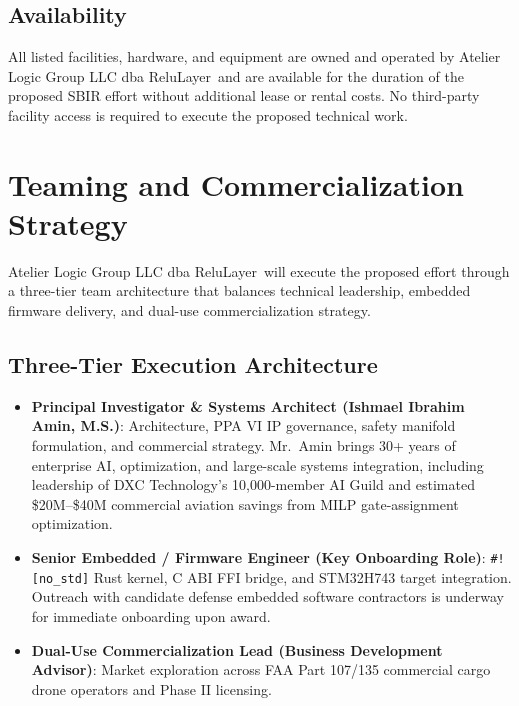 \documentclass[11pt]{article}
\begin{document}
\subsection{Availability}

All listed facilities, hardware, and equipment are owned and operated by Atelier Logic Group LLC dba ReluLayer\texttrademark\ and are available for the duration of the proposed SBIR effort without additional lease or rental costs. No third-party facility access is required to execute the proposed technical work.

\newpage

\section{Teaming and Commercialization Strategy}

Atelier Logic Group LLC dba ReluLayer\texttrademark\ will execute the proposed effort through a three-tier team architecture that balances technical leadership, embedded firmware delivery, and dual-use commercialization strategy.

\subsection{Three-Tier Execution Architecture}

\begin{itemize}

\item \textbf{Principal Investigator \& Systems Architect (Ishmael Ibrahim Amin, M.S.)}: Architecture, PPA VI IP governance, safety manifold formulation, and commercial strategy. Mr.~Amin brings 30+ years of enterprise AI, optimization, and large-scale systems integration, including leadership of DXC Technology's 10,000-member AI Guild and estimated \$20M--\$40M commercial aviation savings from MILP gate-assignment optimization.

\item \textbf{Senior Embedded / Firmware Engineer (Key Onboarding Role)}: \texttt{\#![no\_std]} Rust kernel, C ABI FFI bridge, and STM32H743 target integration. Outreach with candidate defense embedded software contractors is underway for immediate onboarding upon award.

\item \textbf{Dual-Use Commercialization Lead (Business Development Advisor)}: Market exploration across FAA Part 107/135 commercial cargo drone operators and Phase II licensing.

\end{itemize}
\end{document}
